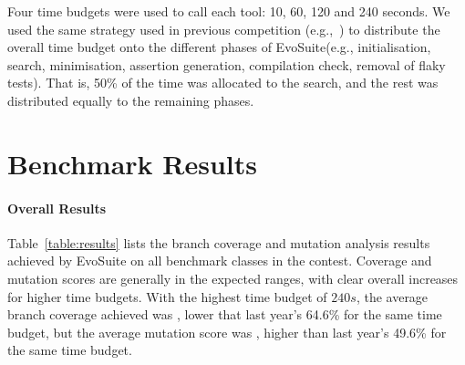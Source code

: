 \documentclass[sigconf,table]{acmart}
\newcommand{\EVOSUITE}{{\sc EvoSuite}\xspace}
\begin{document}
Four time budgets were used to call each tool: 10, 60, 120 and 240
seconds. We used the same strategy used in previous competition
(e.g.,~\cite{evosuiteAtSbst2016}) to distribute the overall time
budget onto the different phases of \EVOSUITE (e.g., initialisation,
search, minimisation, assertion generation, compilation check, removal
of flaky tests). That is, 50\% of the time was allocated to the
search, and the rest was distributed equally to the remaining phases.


\section{Benchmark Results}

\begin{table*}[t]
  \centering
  \caption{\label{table:results}Detailed results of \EVOSUITE on the
    SBST benchmark classes.}
\vspace{-1em}
\resizebox{0.71\textwidth}{!}{  

}	
\end{table*}

% 

% 

\paragraph{Overall Results}

Table~\ref{table:results} lists the branch coverage and mutation
analysis results achieved by \EVOSUITE on all benchmark classes in the
contest. Coverage and mutation scores are generally in the expected
ranges, with clear overall increases for higher time budgets. With the
highest time budget of $240s$, the average branch coverage achieved
was \AvgCovD, lower that last year's 64.6\% for the same time budget,
but the average mutation score was \AvgMutD, higher than last year's
49.6\% for the same time budget.
\end{document}
